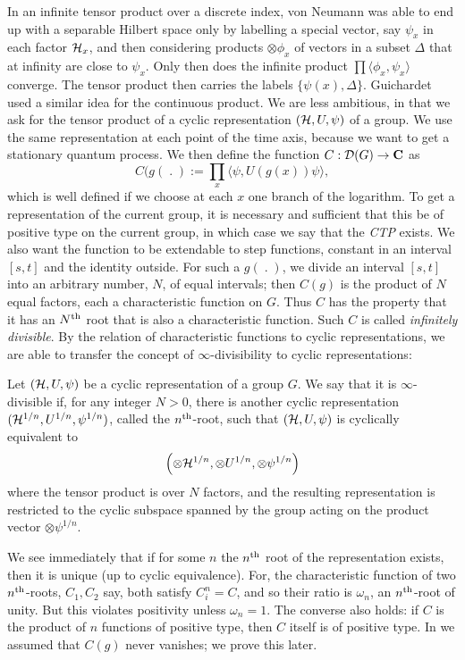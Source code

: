 In an infinite tensor product over a discrete index, von Neumann was able
to end up with a separable Hilbert space only by labelling a special
vector, say $\psi_x$ in each factor ${\cal H}_x$, and then considering
products
$\otimes\phi_x$ of vectors in a subset $\Delta$ that at infinity are close
to $\psi_x$. Only then
does the infinite product $\prod\langle \phi_x,\psi_x\rangle$ converge.
The tensor product then carries the labels
$\{\psi(x),\Delta\}$. Guichardet used a similar idea for the continuous
product. We are less ambitious, in that
we ask for the tensor product of a cyclic representation $({\cal H},
U,\psi)$ of a group. We use the same representation at each point of
the time axis, because we want to get a stationary quantum
process. We then define the function $C:{\cal D}(G)
\rightarrow{\bf C}$ as
\begin{equation}
C(g(\;.\;):=\prod_x\langle\psi,U(g(x))\psi\rangle,
\label{77}
\end{equation}
which is well defined if we choose at each $x$ one branch of the logarithm.
To get a representation of the current group, it is necessary and sufficient
that this be of positive type on the current group, in which case we say that
the {\em CTP} exists.
We also want the function to be extendable to step functions, constant
in an interval $[s,t]$ and the identity outside. For such a $g(\;.\;)$,
we divide an interval $[s,t]$ into an arbitrary number, $N$, of equal
intervals; then $C(g)$ is the product of $N$
equal factors, each a characteristic function on $G$. Thus $C$
has the property
that it has an $N^{\rm th}$ root that is also a characteristic function.
Such $C$ is called {\em infinitely divisible}. By the relation of
characteristic functions to cyclic representations, we are able to
transfer the concept of $\infty$-divisibility to cyclic representations:
\begin{definition}
Let $({\cal H},U,\psi)$ be a cyclic representation of a group $G$. We
say \cite{RFS2} that it is $\infty$-divisible if, for any integer $N>0$,
there is another cyclic representation $({\cal H}^{1/n},U^{1/n},\psi^{1/n})$,
called the $n^{\rm th}$-root, such
that $({\cal H},U,\psi)$ is cyclically equivalent to
\[\left(\otimes{\cal H}^{1/n},\otimes U^{1/n},\otimes\psi^{1/n}\right)\]
where the tensor product is over $N$ factors, and the resulting
representation is restricted to the cyclic subspace spanned by the group
acting on the product vector $\otimes\psi^{1/n}$.
\end{definition}
We see immediately that if for some $n$ the $n^{\rm th}$ root of the
representation exists, then it is unique (up to cyclic equivalence).
For, the characteristic function of two $n^{\rm th}$-roots, $C_1,C_2$ say,
both satisfy $C_i^n=C$, and so their ratio is $\omega_n$, an
$n^{\rm th}$-root of unity. But this violates positivity unless $\omega_n=1$.
The converse also holds: if $C$ is the product of $n$ functions of positive
type, then $C$ itself is of positive type.
In \cite{RFS2} we assumed that $C(g)$ never vanishes; we prove this later.

